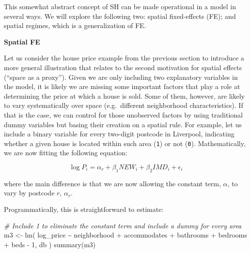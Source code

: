 \documentclass[
]{book}
\newenvironment{Shaded}{\begin{snugshade}}{\end{snugshade}}
\newcommand{\CommentTok}[1]{\textcolor[rgb]{0.56,0.35,0.01}{\textit{#1}}}
\newcommand{\FunctionTok}[1]{\textcolor[rgb]{0.00,0.00,0.00}{#1}}
\newcommand{\NormalTok}[1]{#1}
\newcommand{\OtherTok}[1]{\textcolor[rgb]{0.56,0.35,0.01}{#1}}
\newcommand{\StringTok}[1]{\textcolor[rgb]{0.31,0.60,0.02}{#1}}
\begin{document}
This somewhat abstract concept of SH can be made operational in a model in several ways. We will explore the following two: spatial fixed-effects (FE); and spatial regimes, which is a generalization of FE.

\textbf{Spatial FE}

Let us consider the house price example from the previous section to introduce a more general illustration that relates to the second motivation for spatial effects (``space as a proxy''). Given we are only including two explanatory variables in the model, it is likely we are missing some important factors that play a role at determining the price at which a house is sold. Some of them, however, are likely to vary systematically over space (e.g.~different neighborhood characteristics). If that is the case, we can control for those unobserved factors by using traditional dummy variables but basing their creation on a spatial rule. For example, let us include a binary variable for every two-digit postcode in Liverpool, indicating whether a given house is located within such area (\texttt{1}) or not (\texttt{0}). Mathematically, we are now fitting the following equation:

\[
\log{P_i} = \alpha_r + \beta_1 NEW_i + \beta_2 IMD_i + \epsilon_i
\]

where the main difference is that we are now allowing the constant term, \(\alpha\), to vary by postcode \(r\), \(\alpha_r\).

Programmatically, this is straightforward to estimate:

\begin{Shaded}
\begin{Highlighting}[]
\CommentTok{\# Include \textasciigrave{}{-}1\textasciigrave{} to eliminate the constant term and include a dummy for every area}
\NormalTok{m3 }\OtherTok{\textless{}{-}} \FunctionTok{lm}\NormalTok{(}
  \StringTok{\textquotesingle{}log\_price \textasciitilde{} neighborhood + accommodates + bathrooms + bedrooms + beds {-} 1\textquotesingle{}}\NormalTok{, }
\NormalTok{  db}
\NormalTok{)}
\FunctionTok{summary}\NormalTok{(m3)}
\end{Highlighting}
\end{Shaded}
\end{document}
